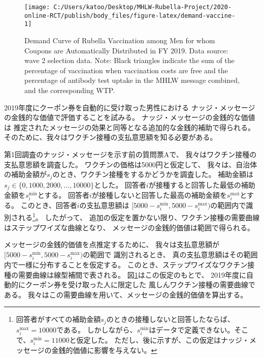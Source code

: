 \documentclass[
  11pt,
  a4paper,
]{article}
\begin{document}
\begin{figure}[t]
\texttt{[image: C:/Users/katoo/Desktop/MHLW-Rubella-Project/2020-online-RCT/publish/body\_files/figure-latex/demand-vaccine-1]} \caption{Demand Curve of Rubella Vaccination among Men for whom Coupons are Automatically Distributed in FY 2019. Data source: wave 2 selection data. Note: Black triangles indicate the sum of the percentage of vaccination when vaccination costs are free and the percentage of antibody test uptake in the MHLW message combined, and the corresponding WTP.}\label{fig:demand-vaccine}
\end{figure}

2019年度にクーポン券を自動的に受け取った男性における
ナッジ・メッセージの金銭的な価値で評価することを試みる。
ナッジ・メッセージの金銭的な価値は
推定されたメッセージの効果と同等となる追加的な金銭的補助で得られる。
そのために、我々はワクチン接種の支払意思額を知る必要がある。

第1回調査のナッジ・メッセージを示す前の質問票Aで、
我々はワクチン接種の支払意思額を調査した。
ワクチンの価格は5000円と仮定して、
我々は、自治体の補助金額が\(s_j\)のとき、ワクチン接種をするかどうかを調査した。
補助金額は\(s_j \in \{0, 1000, 2000, \ldots, 10000\}\)とした。
回答者\(i\)が接種すると回答した最低の補助金額を\(s_i^{\text{min}}\)とする。
回答者\(i\)が接種しないと回答した最高の補助金額を\(s_i^{\text{max}}\)とする。
このとき、回答者\(i\)の支払意思額は
\([5000 - s_i^{\text{min}}, 5000 - s_i^{\text{max}})\)の範囲内で識別される\footnote{回答者がすべての補助金額\(s_j\)のときの接種しないと回答したならば、\(s_i^{\text{max}} = 10000\)である。
  しかしながら、\(s_i^{\text{min}}\)はデータで定義できない。そこで、\(s_i^{\text{min}} = 11000\)と仮定した。
  ただし、後に示すが、この仮定はナッジ・メッセージの金銭的価値に影響を与えない。}。
したがって、
追加の仮定を置かない限り、ワクチン接種の需要曲線はステップワイズな曲線となり、
メッセージの金銭的価値は範囲で得られる。

メッセージの金銭的価値を点推定するために、
我々は支払意思額が
\([5000 - s_i^{\text{min}}, 5000 - s_i^{\text{max}})\)の範囲で
識別されるとき、
真の支払意思額はその範囲内で一様に分布することを仮定する。
このとき、ステップワイズなワクチン接種の需要曲線は線型補間で表される。
図\ref{fig:demand-vaccine}はこの仮定のもとで、
2019年度に自動的にクーポン券を受け取った人に限定した
風しんワクチン接種の需要曲線である。
我々はこの需要曲線を用いて、メッセージの金銭的価値を算出する。
\end{document}
